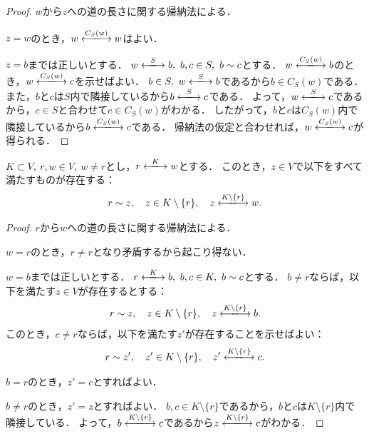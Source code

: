 \begin{proof}
  $w$から$z$への道の長さに関する帰納法による．

  $z = w$のとき，$w \reach{C_S(w)} w$はよい．

  $z = b$までは正しいとする．
  $w \reach{S} b,\ b, c \in S,\ b \sim c$とする．
  $w \reach{C_S(w)} b$のとき，$w \reach{C_S(w)} c$を示せばよい．
  $b \in S,\ w \reach{S} b$であるから$b \in C_S(w)$である．
  また，$b$と$c$は$S$内で隣接しているから$b \reach{S} c$である．
  よって，$w \reach{S} c$であるから，$c \in S$と合わせて$c \in C_S(w)$がわかる．
  したがって，$b$と$c$は$C_S(w)$内で隣接しているから$b \reach{C_S(w)} c$である．
  帰納法の仮定と合わせれば，$w \reach{C_S(w)} c$が得られる．
\end{proof}

\begin{lemma}
  \label{lem:exists_first_neighbor}
  \leanok
  \uses{}
  $K \subset V,\ r, w \in V,\ w \ne r$とし，$r \reach{K} w$とする．
  このとき，$z \in V$で以下をすべて満たすものが存在する：
  \begin{equation}
    r \sim z,\quad z \in K \setminus\{r\},\quad z \reach{K \setminus \{r\}} w.
  \end{equation}
\end{lemma}

\begin{proof}
  $r$から$w$への道の長さに関する帰納法による．

  $w = r$のとき，$r \ne r$となり矛盾するから起こり得ない．

  $w = b$までは正しいとする．
  $r \reach{K} b,\ b, c \in K,\ b \sim c$とする．
  $b \ne r$ならば，以下を満たす$z \in V$が存在するとする：
  \begin{equation}
    r \sim z,\quad z \in K \setminus\{r\},\quad z \reach{K \setminus \{r\}} b.
  \end{equation}
  このとき，$c \ne r$ならば，以下を満たす$z'$が存在することを示せばよい：
  \begin{equation}
    r \sim z',\quad z' \in K \setminus\{r\},\quad z' \reach{K \setminus \{r\}} c.
  \end{equation}
  
  $b = r$のとき，$z' = c$とすればよい．
  
  $b \ne r$のとき，$z' = z$とすればよい．
  $b, c \in K \setminus \{r\}$であるから，$b$と$c$は$K \setminus \{r\}$内で隣接している．
  よって，$b \reach{K \setminus \{r\}} c$であるから$z \reach{K \setminus \{r\}} c$がわかる．
\end{proof}

